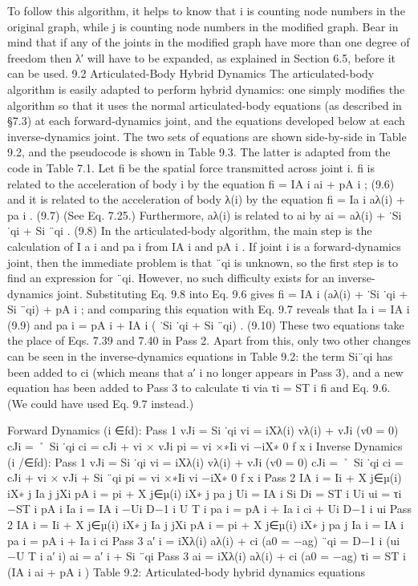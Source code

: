 To follow this algorithm, it helps to know that i is counting node numbers in the original graph, while j is counting node numbers in the modified graph. Bear in mind that if any of the joints in the modified graph have more than one degree of freedom then λ′ will have to be expanded, as explained in Section 6.5, before it can be used. 9.2 Articulated-Body Hybrid Dynamics The articulated-body algorithm is easily adapted to perform hybrid dynamics: one simply modifies the algorithm so that it uses the normal articulated-body equations (as described in §7.3) at each forward-dynamics joint, and the equations developed below at each inverse-dynamics joint. The two sets of equations are shown side-by-side in Table 9.2, and the pseudocode is shown in Table 9.3. The latter is adapted from the code in Table 7.1. Let fi be the spatial force transmitted across joint i. fi is related to the acceleration of body i by the equation fi = IA i ai + pA i ; (9.6) and it is related to the acceleration of body λ(i) by the equation fi = Ia i aλ(i) + pa i . (9.7) (See Eq. 7.25.) Furthermore, aλ(i) is related to ai by ai = aλ(i) + ˙Si ˙qi + Si ¨qi . (9.8) In the articulated-body algorithm, the main step is the calculation of I a i and pa i from IA i and pA i . If joint i is a forward-dynamics joint, then the immediate problem is that ¨qi is unknown, so the first step is to find an expression for ¨qi. However, no such difficulty exists for an inverse-dynamics joint. Substituting Eq. 9.8 into Eq. 9.6 gives fi = IA i (aλ(i) + ˙Si ˙qi + Si ¨qi) + pA i ; and comparing this equation with Eq. 9.7 reveals that Ia i = IA i (9.9) and pa i = pA i + IA i ( ˙Si ˙qi + Si ¨qi) . (9.10) These two equations take the place of Eqs. 7.39 and 7.40 in Pass 2. Apart from this, only two other changes can be seen in the inverse-dynamics equations in Table 9.2: the term Si¨qi has been added to ci (which means that a′ i no longer appears in Pass 3), and a new equation has been added to Pass 3 to calculate τi via τi = ST i fi and Eq. 9.6. (We could have used Eq. 9.7 instead.)

Forward Dynamics (i ∈fd): Pass 1 vJi = Si ˙qi vi = iXλ(i) vλ(i) + vJi (v0 = 0) cJi = ˚ Si ˙qi ci = cJi + vi × vJi pi = vi ×∗Ii vi −iX∗ 0 f x i Inverse Dynamics (i /∈fd): Pass 1 vJi = Si ˙qi vi = iXλ(i) vλ(i) + vJi (v0 = 0) cJi = ˚ Si ˙qi ci = cJi + vi × vJi + Si ¨qi pi = vi ×∗Ii vi −iX∗ 0 f x i Pass 2 IA i = Ii + X j∈µ(i) iX∗ j Ia j jXi pA i = pi + X j∈µ(i) iX∗ j pa j Ui = IA i Si Di = ST i Ui ui = τi −ST i pA i Ia i = IA i −Ui D−1 i U T i pa i = pA i + Ia i ci + Ui D−1 i ui Pass 2 IA i = Ii + X j∈µ(i) iX∗ j Ia j jXi pA i = pi + X j∈µ(i) iX∗ j pa j Ia i = IA i pa i = pA i + Ia i ci Pass 3 a′ i = iXλ(i) aλ(i) + ci (a0 = −ag) ¨qi = D−1 i (ui −U T i a′ i) ai = a′ i + Si ¨qi Pass 3 ai = iXλ(i) aλ(i) + ci (a0 = −ag) τi = ST i (IA i ai + pA i ) Table 9.2: Articulated-body hybrid dynamics equations

